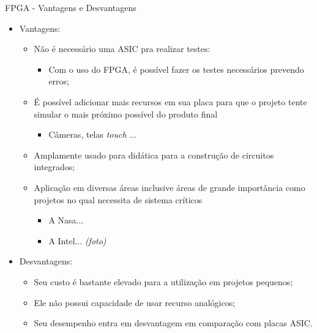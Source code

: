 	\begin{frame}{FPGA - Vantagens e Desvantagens}
		\begin{itemize}
			\item Vantagens:
			\begin{itemize}
				\setlength\itemsep{0.2em}
				\item Não é necessário uma ASIC pra realizar testes:
				\begin{itemize}
					\item Com o uso do FPGA, é possível fazer os testes necessários prevendo erros;
				\end{itemize}

				\item É possível adicionar mais recursos em sua placa para que o projeto tente simular o mais próximo possível do produto final
				\begin{itemize}
					\item Câmeras, telas \textit{touch} ...
				\end{itemize}

				\item Amplamente usado para didática para a construção de circuitos integrados;

				\item Aplicação em diversas áreas inclusive áreas de grande importância como projetos no qual necessita de sistema críticos
				\begin{itemize}
					\item A Nasa...
					\item A Intel... \textit{(foto)}
				\end{itemize}
			\end{itemize}

				\bigskip

			\item Desvantagens:
			\begin{itemize}
				\setlength\itemsep{0.2em}
				\item Seu custo é bastante elevado para a utilização em projetos pequenos;

				\item Ele não possui capacidade de usar recurso analógicos;

				\item Seu desempenho entra em desvantagem em comparação com placas ASIC.
			\end{itemize}
		\end{itemize}
	\end{frame}

